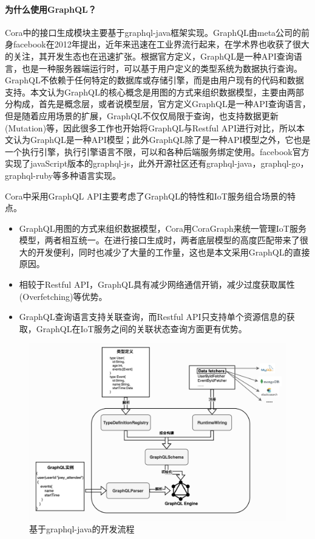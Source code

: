 \documentclass[winfonts,master,twoside]{njuthesis}
\begin{document}
\paragraph{为什么使用GraphQL？}
Cora中的接口生成模块主要基于graphql-java\cite{graphqljava}框架实现。GraphQL\cite{graphql}由meta公司的前身facebook在2012年提出，近年来迅速在工业界流行起来，在学术界也收获了很大的关注，其开发生态也在迅速扩张\cite{DBLP:conf/icsoc/WitternCDBM19}。根据官方定义\cite{graphqlsdl}，GraphQL是一种API查询语言，也是一种服务器端运行时，可以基于用户定义的类型系统为数据执行查询。GraphQL不依赖于任何特定的数据库或存储引擎，而是由用户现有的代码和数据支持。本文认为GraphQL的核心概念是用图的方式来组织数据模型，主要由两部分构成，首先是概念层，或者说模型层，官方定义GraphQL是一种API查询语言，但是随着应用场景的扩展，GraphQL不仅仅局限于查询，也支持数据更新(Mutation)等，因此很多工作也开始将GraphQL与Restful API进行对比，所以本文认为GraphQL是一种API模型；此外GraphQL除了是一种API模型之外，它也是一个执行引擎，执行引擎语言不限，可以和各种后端服务绑定使用。facebook官方实现了javaScript版本的graphql-js，此外开源社区还有graphql-java，graphql-go，graphql-ruby等多种语言实现。

Cora中采用GraphQL API主要考虑了GraphQL的特性和IoT服务组合场景的特点。
\begin{itemize}
    \item GraphQL用图的方式来组织数据模型，Cora用CoraGraph来统一管理IoT服务模型，两者相互统一。在进行接口生成时，两者底层模型的高度匹配带来了很大的开发便利，同时也减少了大量的工作量，这也是本文采用GraphQL的直接原因。
    \item 相较于Restful API，GraphQL具有减少网络通信开销，减少过度获取属性(Overfetching)等优势。
    \item GraphQL查询语言支持关联查询，而Restful API只支持单个资源信息的获取，GraphQL在IoT服务之间的关联状态查询方面更有优势。
\end{itemize}

\begin{figure}
	\centering
	\includegraphics[width=1.0\textwidth]{figure/4-cora/graphql_java_architecture.png}
	\caption{基于graphql-java的开发流程}
	\label{ontransact-impl}
\end{figure}
\end{document}
